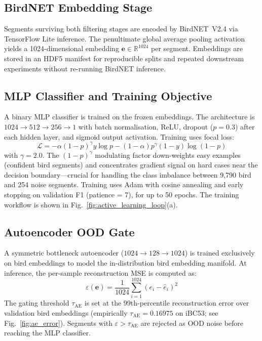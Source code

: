 \documentclass[conference]{IEEEtran}
\begin{document}
\subsection{BirdNET Embedding Stage}
Segments surviving both filtering stages are encoded by BirdNET~V2.4 via TensorFlow Lite inference. The penultimate global average pooling activation yields a 1024-dimensional embedding $\mathbf{e} \in \mathbb{R}^{1024}$ per segment. Embeddings are stored in an HDF5 manifest for reproducible splits and repeated downstream experiments without re-running BirdNET inference.

\subsection{MLP Classifier and Training Objective}
A binary MLP classifier is trained on the frozen embeddings. The architecture is $1024 \to 512 \to 256 \to 1$ with batch normalisation, ReLU, dropout ($p=0.3$) after each hidden layer, and sigmoid output activation. Training uses focal loss:
\begin{equation}
\mathcal{L} = -\alpha(1-p)^\gamma y\log p - (1-\alpha)p^\gamma(1-y)\log(1-p)
\label{eq:focal}
\end{equation}
with $\gamma=2.0$. The $(1-p)^\gamma$ modulating factor down-weights easy examples (confident bird segments) and concentrates gradient signal on hard cases near the decision boundary---crucial for handling the class imbalance between 9,790 bird and 254 noise segments. Training uses Adam with cosine annealing and early stopping on validation F1 (patience = 7), for up to 50 epochs.
The training workflow is shown in Fig.~\ref{fig:active_learning_loop}(a).

\subsection{Autoencoder OOD Gate}
A symmetric bottleneck autoencoder ($1024 \to 128 \to 1024$) is trained exclusively on bird embeddings to model the in-distribution bird embedding manifold. At inference, the per-sample reconstruction MSE is computed as:
\begin{equation}
\varepsilon(\mathbf{e}) = \frac{1}{1024}\sum_{i=1}^{1024}(e_i - \hat{e}_i)^2
\label{eq:mse}
\end{equation}
The gating threshold $\tau_\text{AE}$ is set at the 99th-percentile reconstruction error over validation bird embeddings (empirically $\tau_\text{AE} = 0.16975$ on iBC53; see Fig.~\ref{fig:ae_error}). Segments with $\varepsilon > \tau_\text{AE}$ are rejected as OOD noise before reaching the MLP classifier.
\end{document}
